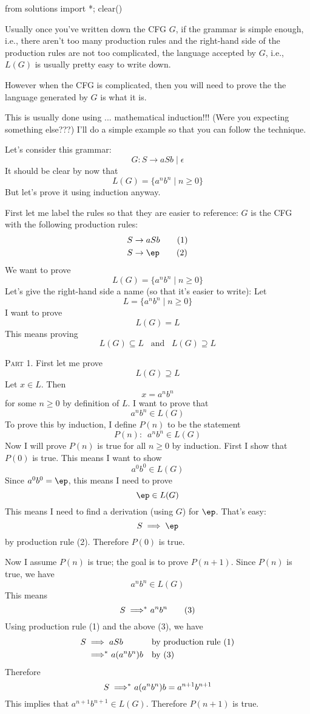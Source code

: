 \begin{python0}
from solutions import *; clear()
\end{python0}

Usually once you've written down the CFG $G$, if the grammar is simple enough,
i.e., there aren't too many production rules and the right-hand side of the 
production rules are not too complicated, the
language accepted by $G$, i.e., $L(G)$ is usually pretty easy to write down.

However when the CFG is complicated, then you will need to prove the
the language generated by $G$ is what it is.

This is usually done using ... mathematical induction!!! 
(Were you expecting something else???)
I'll do a simple example so that you can follow the technique.

Let's consider this grammar:
\[
G : S \rightarrow aSb \mid \epsilon
\]
It should be clear by now that 
\[
L(G) = \{ a^nb^n \mid n \geq 0 \}
\]
But let's prove it using induction anyway.

First let me label the rules so that they are easier to reference:
$G$ is the CFG with the following production rules:
\begin{align*}
S &\rightarrow aSb \tag{1} \\
S &\rightarrow \ep \tag{2} \\
\end{align*}
We want to prove
\[
L(G) = \{ a^nb^n \mid n \geq 0\}
\]
Let's give the right-hand side a name (so that it's easier to write):
Let
\[
L = \{ a^nb^n \mid n \geq 0\}
\]
I want to prove 
\[
L(G) = L
\]
This means proving 
\[
L(G) \subseteq L
\,\,\, \text{ and } \,\,\,
L(G) \supseteq L
\]

\textsc{Part 1.}
First let me prove
\[
L(G) \supseteq L
\]
Let $x \in L$.
Then 
\[
x = a^n b^n
\]
for some $n \geq 0$ by definition of $L$.
I want to prove that 
\[
a^n b^n \in L(G)
\]
To prove this by induction, I define $P(n)$ to be the statement
\[
P(n): \,\,\, a^n b^n \in L(G)
\]
Now I will prove $P(n)$ is true for all $n \geq 0$ by induction.
First I show that $P(0)$ is true. This means I want to show
\[
a^0 b^0 \in L(G)
\]
Since $a^0 b^0 = \ep$, this means I need to prove
\[
\ep \in L(G)
\]
This means I need to find a derivation (using $G$) for $\ep$.
That's easy:
\[
S \implies \ep
\]
by production rule (2).
Therefore $P(0)$ is true.

Now I assume $P(n)$ is true; the goal is to prove $P(n+1)$.
Since $P(n)$ is true, we have
\[
a^n b^n \in L(G)
\]
This means
\[
S \implies^{\hspace{-0.2cm}*}\ a^nb^n \tag{3}
\]
Using production rule (1) and the above (3), we have
\begin{align*}
S 
&\implies aSb                            & & \text{by production rule (1)} \\
&\implies^{\hspace{-0.2cm}*}\ a(a^nb^n)b & & \text{by (3)}
\end{align*}
Therefore
\[
S \implies^{\hspace{-0.2cm}*}\ a(a^nb^n)b = a^{n+1} b^{n+1}  
\]
This implies that $a^{n+1}b^{n+1} \in L(G)$.
Therefore $P(n+1)$ is true.

